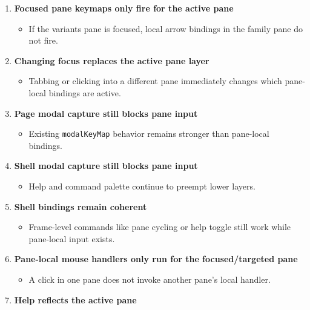 \begin{enumerate}
\def\labelenumi{\arabic{enumi}.}
\tightlist
\item
  \textbf{Focused pane keymaps only fire for the active pane}

  \begin{itemize}
  \tightlist
  \item
    If the variants pane is focused, local arrow bindings in the family pane do not fire.
  \end{itemize}
\item
  \textbf{Changing focus replaces the active pane layer}

  \begin{itemize}
  \tightlist
  \item
    Tabbing or clicking into a different pane immediately changes which pane-local bindings are active.
  \end{itemize}
\item
  \textbf{Page modal capture still blocks pane input}

  \begin{itemize}
  \tightlist
  \item
    Existing \texttt{m\allowbreak{}o\allowbreak{}d\allowbreak{}a\allowbreak{}l\allowbreak{}K\allowbreak{}e\allowbreak{}y\allowbreak{}M\allowbreak{}a\allowbreak{}p} behavior remains stronger than pane-local bindings.
  \end{itemize}
\item
  \textbf{Shell modal capture still blocks pane input}

  \begin{itemize}
  \tightlist
  \item
    Help and command palette continue to preempt lower layers.
  \end{itemize}
\item
  \textbf{Shell bindings remain coherent}

  \begin{itemize}
  \tightlist
  \item
    Frame-level commands like pane cycling or help toggle still work while pane-local input exists.
  \end{itemize}
\item
  \textbf{Pane-local mouse handlers only run for the focused/targeted pane}

  \begin{itemize}
  \tightlist
  \item
    A click in one pane does not invoke another pane's local handler.
  \end{itemize}
\item
  \textbf{Help reflects the active pane}


\end{enumerate}
